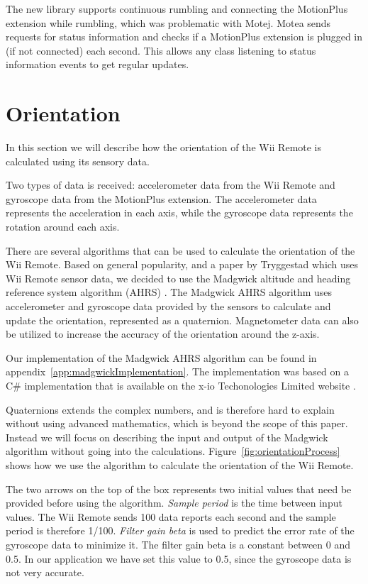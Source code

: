 The new library supports continuous rumbling and connecting the MotionPlus extension while rumbling, which was problematic with Motej. Motea sends requests for status information and checks if a MotionPlus extension is plugged in (if not connected) each second. This allows any class listening to status information events to get regular updates.

\section{Orientation}
In this section we will describe how the orientation of the Wii Remote is calculated using its sensory data.

Two types of data is received: accelerometer data from the Wii Remote and gyroscope data from the MotionPlus extension. The accelerometer data represents the acceleration in each axis, while the gyroscope data represents the rotation around each axis.

There are several algorithms that can be used to calculate the orientation of the Wii Remote. Based on general popularity, and a paper by Tryggestad \cite{Tryggestad} which uses Wii Remote sensor data, we decided to use the Madgwick altitude and heading reference system algorithm (AHRS) \cite{madgwick}. The Madgwick AHRS algorithm uses accelerometer and gyroscope data provided by the sensors to calculate and update the orientation, represented as a quaternion. Magnetometer data can also be utilized to increase the accuracy of the orientation around the z-axis.

Our implementation of the Madgwick AHRS algorithm can be found in appendix~\ref{app:madgwickImplementation}. The implementation was based on a C\# implementation that is available on the x-io Techonologies Limited website \cite{opensourceMadgwick}. 

Quaternions extends the complex numbers, and is therefore hard to explain without using advanced mathematics, which is beyond the scope of this paper. Instead we will focus on describing the input and output of the Madgwick algorithm without going into the calculations. Figure~\ref{fig:orientationProcess} shows how we use the algorithm to calculate the orientation of the Wii Remote. 

The two arrows on the top of the box represents two initial values that need be provided before using the algorithm. \emph{Sample period} is the time between input values. The Wii Remote sends 100 data reports each second and the sample period is therefore 1/100. \emph{Filter gain beta} is used to predict the error rate of the gyroscope data to minimize it. The filter gain beta is a constant between 0 and 0.5. In our application we have set this value to 0.5, since the gyroscope data is not very accurate.

